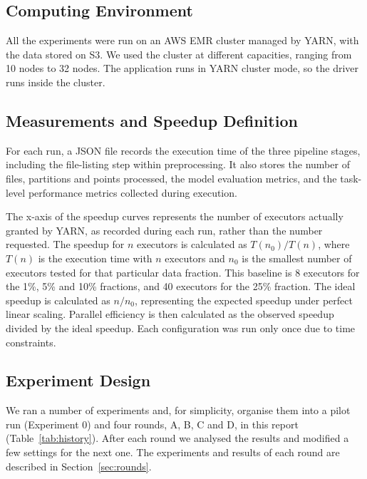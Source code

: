 \documentclass[a4paper, 11pt]{article} %
\begin{document}
\subsection{Computing Environment}
All the experiments were run on an AWS EMR cluster managed by YARN, with the data stored on S3. We used the cluster at different capacities, ranging from 10 nodes to 32 nodes. The application runs in YARN cluster mode, so the driver runs inside the cluster.

\subsection{Measurements and Speedup Definition}
For each run, a JSON file records the execution time of the three pipeline stages, including the file-listing step within preprocessing. It also stores the number of files, partitions and points processed, the model evaluation metrics, and the task-level performance metrics collected during execution.

The x-axis of the speedup curves represents the number of executors actually granted by YARN, as recorded during each run, rather than the number requested. The speedup for \(n\) executors is calculated as \(T(n_0)/T(n)\), where \(T(n)\) is the execution time with \(n\) executors and \(n_0\) is the smallest number of executors tested for that particular data fraction. This baseline is 8 executors for the 1\%, 5\% and 10\% fractions, and 40 executors for the 25\% fraction. The ideal speedup is calculated as \(n/n_0\), representing the expected speedup under perfect linear scaling. Parallel efficiency is then calculated as the observed speedup divided by the ideal speedup. Each configuration was run only once due to time constraints.

\subsection{Experiment Design}
We ran a number of experiments and, for simplicity, organise them into a pilot run (Experiment 0) and four rounds, A, B, C and D, in this report (Table~\ref{tab:history}). After each round we analysed the results and modified a few settings for the next one. The experiments and results of each round are described in Section~\ref{sec:rounds}.
\end{document}
